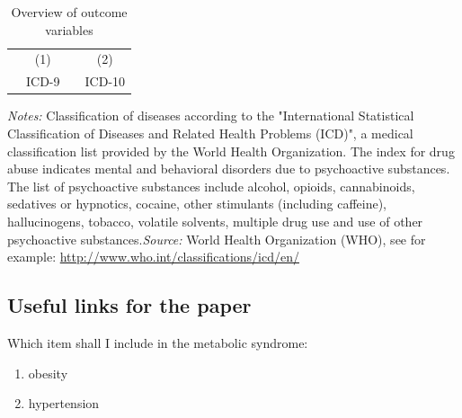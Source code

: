 \documentclass[11pt, a4paper]{article} %
\begin{document}
\begin{table}[h] %
\begin{threeparttable}
\centering %
\caption{Overview of outcome variables} %
\label{tab:outcomes_coding_main_chapters} 
\begin{tabular}{lrrr} %
\toprule %
        &\multicolumn{1}{c}{(1)}& &\multicolumn{1}{c}{(2)}\\
&\multicolumn{1}{c}{ICD-9} & & \multicolumn{1}{c}{ICD-10} \\ 
\midrule

\bottomrule %
\end{tabular}
\begin{tablenotes}
      \scriptsize{ \item \textit{Notes:} Classification of diseases according to the "International Statistical Classification of Diseases and Related Health Problems (ICD)", a medical classification list provided by the World Health Organization. The index for drug abuse indicates mental and behavioral disorders due to psychoactive substances. The list of psychoactive substances include alcohol, opioids, cannabinoids, sedatives or hypnotics, cocaine, other stimulants (including caffeine), hallucinogens, tobacco, volatile solvents,  multiple drug use and use of other psychoactive substances.\newline \textit{Source:} World Health Organization (WHO), see for example: \href{http://www.who.int/classifications/icd/en/}{http://www.who.int/classifications/icd/en/} }
    \end{tablenotes}
  \end{threeparttable}
\end{table}

\newpage
\subsection{Useful links for the paper}

Which item shall I include in the metabolic syndrome: 
\begin{enumerate}
\item obesity
\item hypertension
\end{enumerate}
\end{document}
